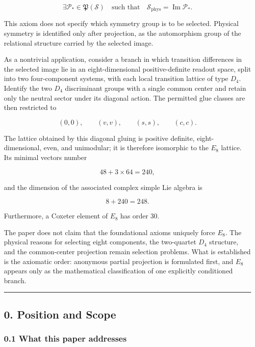 \documentclass[
  a4paper,
]{article}
\begin{document}
\[
\boxed{
\exists\mathcal P_*\in\mathfrak P(\mathscr S)
\quad\text{such that}\quad
\mathscr S_{\mathrm{phys}}
{}=
\operatorname{Im}\mathcal P_*.
}
\]

This axiom does not specify which symmetry group is to be selected.
Physical symmetry is identified only after projection, as the
automorphism group of the relational structure carried by the selected
image.

As a nontrivial application, consider a branch in which transition
differences in the selected image lie in an eight-dimensional
positive-definite readout space, split into two four-component systems,
with each local transition lattice of type \(D_4\). Identify the two
\(D_4\) discriminant groups with a single common center and retain only
the neutral sector under its diagonal action. The permitted glue classes
are then restricted to

\[
(0,0),\qquad(v,v),\qquad(s,s),\qquad(c,c).
\]

The lattice obtained by this diagonal gluing is positive definite,
eight-dimensional, even, and unimodular; it is therefore isomorphic to
the \(E_8\) lattice. Its minimal vectors number

\[
48+3\times64=240,
\]

and the dimension of the associated complex simple Lie algebra is

\[
8+240=248.
\]

Furthermore, a Coxeter element of \(E_8\) has order 30.

The paper does not claim that the foundational axioms uniquely force
\(E_8\). The physical reasons for selecting eight components, the
two-quartet \(D_4\) structure, and the common-center projection remain
selection problems. What is established is the axiomatic order:
anonymous partial projection is formulated first, and \(E_8\) appears
only as the mathematical classification of one explicitly conditioned
branch.

\begin{center}\rule{0.5\linewidth}{0.5pt}\end{center}

\subsection{0. Position and Scope}\label{position-and-scope}

\subsubsection{0.1 What this paper
addresses}\label{what-this-paper-addresses}
\end{document}
